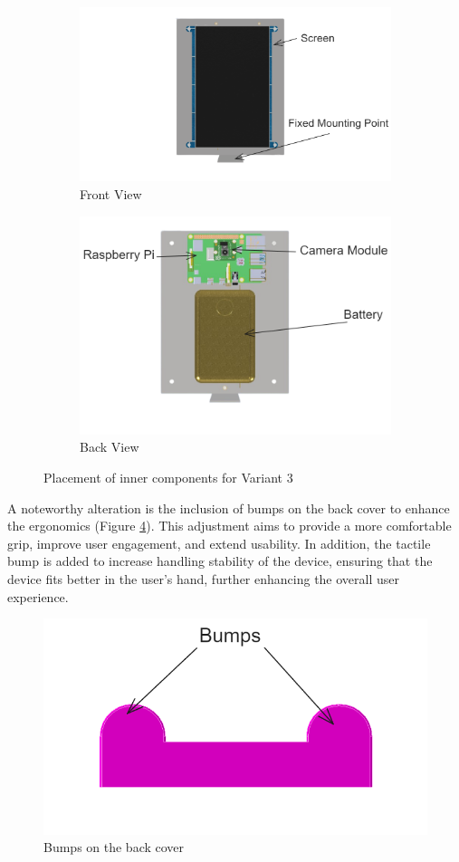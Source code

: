 \begin{figure}[!ht]
    \centering
    \begin{subfigure}[c]{0.47\textwidth}
        \begin{minipage}{\textwidth}
            \centering
            \includegraphics[height=3.8 cm]{texs/Part1/chapter4/image/v32.png}
        \end{minipage}
        \caption{Front View}
        \label{fig:variant3_front_components}
    \end{subfigure}
    \begin{subfigure}[c]{0.47\textwidth}
        \begin{minipage}{\textwidth}
            \centering
            \includegraphics[height=3.8 cm]{texs/Part1/chapter4/image/v33.png}
        \end{minipage}
        \caption{Back View}
        \label{fig:variant3_back_components}
    \end{subfigure}
    \caption{Placement of inner components for Variant 3}
    \label{fig:variant3_inner_components}
\end{figure}

A noteworthy alteration is the inclusion of bumps on the back cover to enhance the ergonomics (Figure \ref{fig:variant3_bumps}). This adjustment aims to provide a more comfortable grip, improve user engagement, and extend usability. In addition, the tactile bump is added to increase handling stability of the device, ensuring that the device fits better in the user's hand, further enhancing the overall user experience.

\begin{figure}[!ht]
    \centering
    \includegraphics[width=0.5\linewidth]{texs/Part1/chapter4/image/v34.png}
    \caption{Bumps on the back cover}
    \label{fig:variant3_bumps}
\end{figure}

